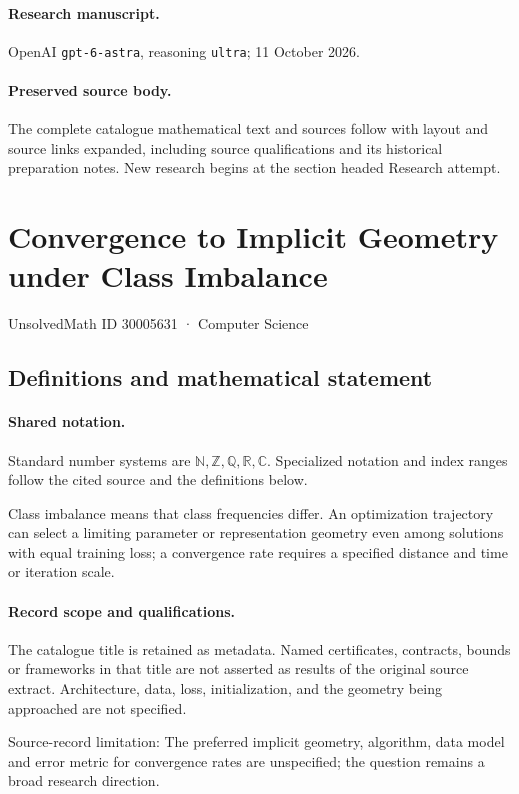 \documentclass[11pt]{article}
\begin{document}
\paragraph{Research manuscript.} OpenAI \texttt{gpt-6-astra}, reasoning \texttt{ultra}; 11 October 2026.
\paragraph{Preserved source body.} The complete catalogue mathematical text and sources follow with layout and source links expanded, including source qualifications and its historical preparation notes. New research begins at the section headed Research attempt.

\section{Convergence to Implicit Geometry under Class Imbalance}\label{30005631}
{\small UnsolvedMath ID 30005631 · Computer Science}
\subsection{Definitions and mathematical statement}

\paragraph{Shared notation.}Standard number systems are $\mathbb N,\mathbb Z,\mathbb Q,\mathbb R,\mathbb C$. Specialized notation and index ranges follow the cited source and the definitions below.


Class imbalance means that class frequencies differ. An optimization trajectory can select a limiting parameter or representation geometry even among solutions with equal training loss; a convergence rate requires a specified distance and time or iteration scale.
\paragraph{Record scope and qualifications.}
The catalogue title is retained as metadata. Named certificates, contracts, bounds or frameworks in that title are not asserted as results of the original source extract.
Architecture, data, loss, initialization, and the geometry being approached are not specified.

Source-record limitation: The preferred implicit geometry, algorithm, data model and error metric for convergence rates are unspecified; the question remains a broad research direction.
\end{document}
